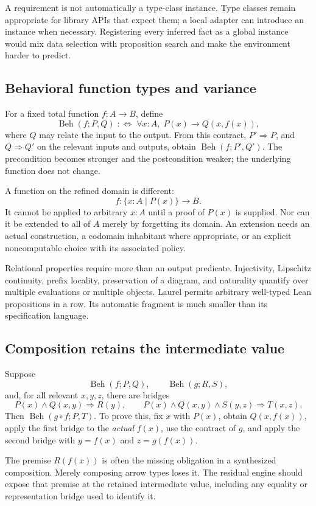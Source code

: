 \documentclass[11pt,a4paper]{article}
\newcommand{\Beh}{\operatorname{Beh}}
\theoremstyle{definition}
\theoremstyle{remark}
\begin{document}
A requirement is not automatically a type-class instance. Type classes remain appropriate for library APIs that expect them; a local adapter can introduce an instance when necessary. Registering every inferred fact as a global instance would mix data selection with proposition search and make the environment harder to predict.

\subsection{Behavioral function types and variance}
For a fixed total function $f:A\to B$, define
\[
 \Beh(f;P,Q)\;:\!\iff\;\forall x:A,\;P(x)\to Q(x,f(x)),
\]
where $Q$ may relate the input to the output. From this contract, $P'\Rightarrow P$, and $Q\Rightarrow Q'$ on the relevant inputs and outputs, obtain $\Beh(f;P',Q')$. The precondition becomes stronger and the postcondition weaker; the underlying function does not change.

A function on the refined domain is different:
\[
 f:\{x:A\mid P(x)\}\to B.
\]
It cannot be applied to arbitrary $x:A$ until a proof of $P(x)$ is supplied. Nor can it be extended to all of $A$ merely by forgetting its domain. An extension needs an actual construction, a codomain inhabitant where appropriate, or an explicit noncomputable choice with its associated policy.

Relational properties require more than an output predicate. Injectivity, Lipschitz continuity, prefix locality, preservation of a diagram, and naturality quantify over multiple evaluations or multiple objects. Laurel permits arbitrary well-typed Lean propositions in a row. Its automatic fragment is much smaller than its specification language.

\subsection{Composition retains the intermediate value}
Suppose
\[
 \Beh(f;P,Q),\qquad \Beh(g;R,S),
\]
and, for all relevant $x,y,z$, there are bridges
\[
 P(x)\land Q(x,y)\Longrightarrow R(y),\qquad
 P(x)\land Q(x,y)\land S(y,z)\Longrightarrow T(x,z).
\]
Then $\Beh(g\circ f;P,T)$. To prove this, fix $x$ with $P(x)$, obtain $Q(x,f(x))$, apply the first bridge to the \emph{actual} $f(x)$, use the contract of $g$, and apply the second bridge with $y=f(x)$ and $z=g(f(x))$.

The premise $R(f(x))$ is often the missing obligation in a synthesized composition. Merely composing arrow types loses it. The residual engine should expose that premise at the retained intermediate value, including any equality or representation bridge used to identify it.
\end{document}
